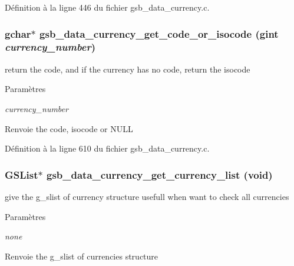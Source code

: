 Définition à la ligne 446 du fichier gsb\_\-data\_\-currency.c.

\subsubsection[{gsb\_\-data\_\-currency\_\-get\_\-code\_\-or\_\-isocode}]{\setlength{\rightskip}{0pt plus 5cm}gchar$\ast$ gsb\_\-data\_\-currency\_\-get\_\-code\_\-or\_\-isocode (gint {\em currency\_\-number})}\label{gsb__data__currency_8h_ab8327a4b2ece3d38dab932c9872b850b}
return the code, and if the currency has no code, return the isocode


\begin{DoxyParams}{Paramètres}
\item[{\em currency\_\-number}]\end{DoxyParams}
\begin{DoxyReturn}{Renvoie}
the code, isocode or NULL 
\end{DoxyReturn}


Définition à la ligne 610 du fichier gsb\_\-data\_\-currency.c.

\subsubsection[{gsb\_\-data\_\-currency\_\-get\_\-currency\_\-list}]{\setlength{\rightskip}{0pt plus 5cm}GSList$\ast$ gsb\_\-data\_\-currency\_\-get\_\-currency\_\-list (void)}\label{gsb__data__currency_8h_a147d01fc4583c3c4c34189cff9611db1}
give the g\_\-slist of currency structure usefull when want to check all currencies


\begin{DoxyParams}{Paramètres}
\item[{\em none}]\end{DoxyParams}
\begin{DoxyReturn}{Renvoie}
the g\_\-slist of currencies structure 
\end{DoxyReturn}



